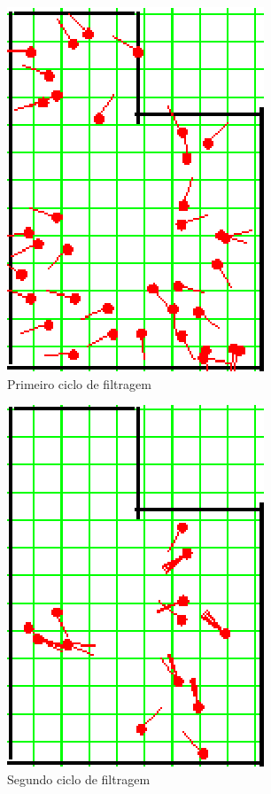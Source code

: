 \begin{figure}[H]
  \centering
  \includegraphics[scale=1]{figuras/cen3_ex2/2.eps}
  \caption[Primeiro Ciclo de Filtragem]{Primeiro ciclo de filtragem}
  \label{img:cen3_ex2_2}
\end{figure}

\begin{figure}[H]
  \centering
  \includegraphics[scale=1]{figuras/cen3_ex2/3.eps}
  \caption[Segundo Ciclo de Filtragem]{Segundo ciclo de filtragem}
  \label{img:cen3_ex2_3}
\end{figure}

